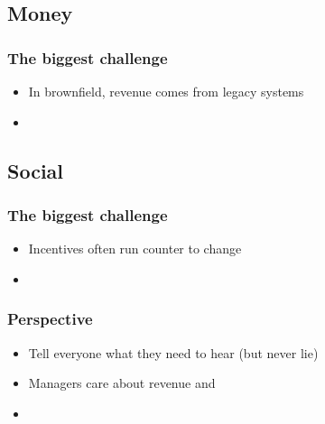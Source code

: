 \documentclass[t]{beamer}
\begin{document}
\subsection{Money}

\begin{frame}
	\frametitle{The biggest challenge}
	\begin{itemize}
		\item In brownfield, revenue comes from legacy systems
		\item 
	\end{itemize}
\end{frame}

\subsection{Social}

\begin{frame}
	\frametitle{The biggest challenge}
	\begin{itemize}
		\item Incentives often run counter to change
		\item 
	\end{itemize}
\end{frame}

\begin{frame}
	\frametitle{Perspective}
	\begin{itemize}
		\item Tell everyone what they need to hear (but never lie)
		\item Managers care about revenue and %
		\item 
	\end{itemize}
\end{frame}





\end{document}
